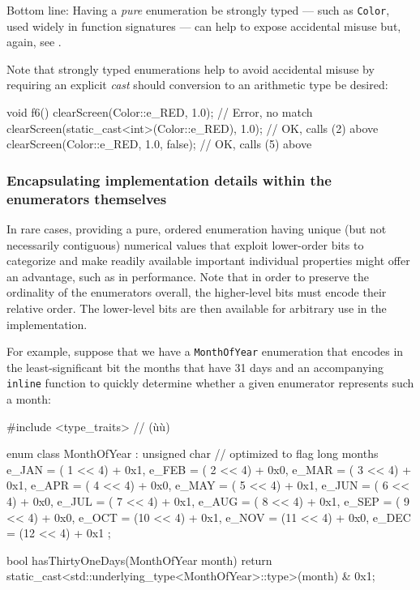 \noindent Bottom line: Having a \emph{pure} enumeration be strongly typed --- such as
\lstinline!Color!, used widely in function signatures --- can help to expose accidental misuse but, again, see .

Note that strongly typed enumerations help to avoid accidental misuse by
requiring an explicit \emph{cast} should conversion to an arithmetic
type be desired:

\begin{emcppslisting}[emcppsbatch=e10]
void f6()
{
    clearScreen(Color::e_RED, 1.0);                   // Error, no match
    clearScreen(static_cast<int>(Color::e_RED), 1.0); // OK, calls (2) above
    clearScreen(Color::e_RED, 1.0, false);            // OK, calls (5) above
}
\end{emcppslisting}


\subsubsection[Encapsulating implementation details within the enumerators themselves]{Encapsulating implementation details within the enumerators themselves}\label{encapsulating-implementation-details-within-the-enumerators-themselves}

In rare cases, providing a pure, ordered enumeration having unique (but
not necessarily contiguous) numerical values that exploit lower-order
bits to categorize and make readily available important
individual properties might offer an advantage, such as in performance. Note that in order to preserve the ordinality of the enumerators
overall, the higher-level bits must encode their relative order. The
lower-level bits are then available for arbitrary use in the
  implementation.

For example, suppose that we have a \lstinline!MonthOfYear! enumeration that encodes in the least-significant bit the months
that have 31 days  and an accompanying \lstinline!inline! function to quickly determine whether a given enumerator represents such a month:

\begin{emcppslisting}
#include <type_traits>  // (ù{}ù)

enum class MonthOfYear : unsigned char  // optimized to flag long months
{
    e_JAN = ( 1 << 4) + 0x1,
    e_FEB = ( 2 << 4) + 0x0,
    e_MAR = ( 3 << 4) + 0x1,
    e_APR = ( 4 << 4) + 0x0,
    e_MAY = ( 5 << 4) + 0x1,
    e_JUN = ( 6 << 4) + 0x0,
    e_JUL = ( 7 << 4) + 0x1,
    e_AUG = ( 8 << 4) + 0x1,
    e_SEP = ( 9 << 4) + 0x0,
    e_OCT = (10 << 4) + 0x1,
    e_NOV = (11 << 4) + 0x0,
    e_DEC = (12 << 4) + 0x1
};

bool hasThirtyOneDays(MonthOfYear month)
{
    return static_cast<std::underlying_type<MonthOfYear>::type>(month) & 0x1;
}
\end{emcppslisting}

